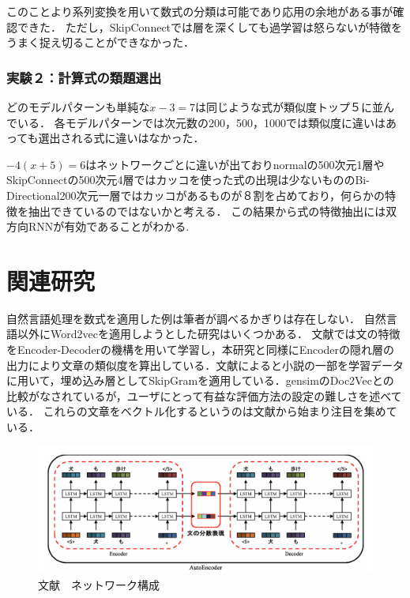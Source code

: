 \documentclass[a4j,11pt,report]{jsbook}
\begin{document}
このことより系列変換を用いて数式の分類は可能であり応用の余地がある事が確認できた．
ただし，SkipConnectでは層を深くしても過学習は怒らないが特徴をうまく捉え切ることができなかった．

\subsection{実験２：計算式の類題選出}

どのモデルパターンも単純な$x-3=7$は同じような式が類似度トップ５に並んでいる．
各モデルパターンでは次元数の200，500，1000では類似度に違いはあっても選出される式に違いはなかった．

$-4(x+5)=6$はネットワークごとに違いが出ておりnormalの500次元1層やSkipConnectの500次元4層ではカッコを使った式の出現は少ないもののBi-Directional200次元一層ではカッコがあるものが８割を占めており，何らかの特徴を抽出できているのではないかと考える．
この結果から式の特徴抽出には双方向RNNが有効であることがわかる.



\chapter{関連研究\label{ch:relsatedwork}}
自然言語処理を数式を適用した例は筆者が調べるかぎりは存在しない．
自然言語以外にWord2vecを適用しようとした研究はいくつかある．
文献\cite{kannrenn3}では文の特徴をEncoder-Decoderの機構を用いて学習し，本研究と同様にEncoderの隠れ層の出力により文章の類似度を算出している．文献\cite{kannrenn3}によると小説の一部を学習データに用いて，埋め込み層としてSkipGramを適用している．gensimのDoc2Vecとの比較がなされているが，ユーザにとって有益な評価方法の設定の難しさを述べている．
これらの文章をベクトル化するというのは文献\cite{1612.06778}から始まり注目を集めている．

\begin{center}
  \begin{figure}[H]
    \centering
    \includegraphics[width=\linewidth]{image/lstm_hidden_vecter.png}
    \caption{文献\cite{kannrenn3}　ネットワーク構成}
    \label{fig:kannrenn3fig}
  \end{figure}
\end{center}
\end{document}
